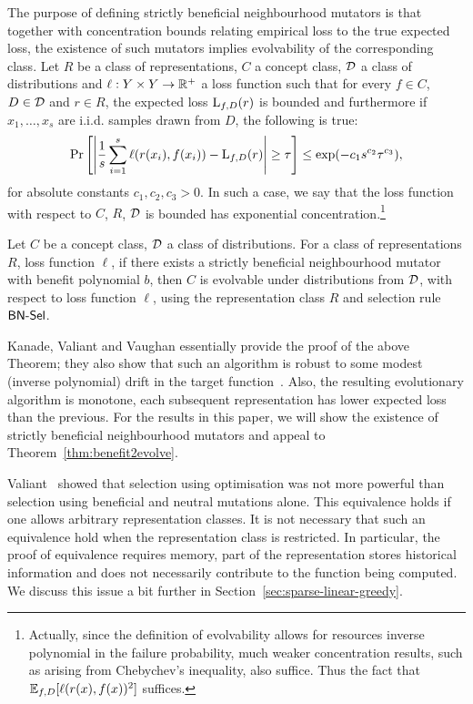 The purpose of defining strictly beneficial neighbourhood mutators is that
together with concentration bounds relating empirical loss to the true expected
loss, the existence of such mutators implies evolvability of the corresponding
class. Let $R$ be a class of representations, $C$ a concept class, ${\mathcal D}$ a
class of distributions and $\ell : Y \times Y \rightarrow \mathbb{R}^+$ a loss
function such that for every $f \in C$, $D \in {\mathcal D}$ and $r \in R$, the
expected loss $\mathrm{L}_{f, D}(r)$ is bounded and furthermore if $x_1, \ldots, x_s$
are i.i.d. samples drawn from $D$, the following is true:
%
\begin{align}
\Pr\left[ \left|\frac{1}{s} \sum_{i=1}^s \ell(r(x_i), f(x_i)) - \mathrm{L}_{f,
D}(r)\right| \geq \tau \right] \leq \exp( -c_1 s^{c_2} \tau^{c_3}),
\label{eqn:concentration-bound}
\end{align}
%
for absolute constants $c_1, c_2, c_3 > 0$. In such a case, we say that the loss
function with respect to $C$, $R$, ${\mathcal D}$ is bounded has exponential
concentration.\footnote{Actually, since the definition of evolvability allows
for resources inverse polynomial in the failure probability, much weaker
concentration results, such as arising from Chebychev's inequality, also
suffice. Thus the fact that $\mathbb{E}_{f, D}[\ell(r(x), f(x))^2]$ suffices.
}

\begin{theorem} \label{thm:benefit2evolve}
Let $C$ be a concept class, ${\mathcal D}$ a class of distributions. For a class of
representations $R$, loss function $\ell$, if there exists a strictly
beneficial neighbourhood mutator with benefit polynomial $b$, then $C$ is
evolvable under distributions from ${\mathcal D}$, with respect to loss function
$\ell$, using the representation class $R$ and selection rule $\mathsf{BN\mbox{-}Sel}$.
\end{theorem}

Kanade, Valiant and Vaughan essentially provide the proof of the above Theorem;
they also show that such an algorithm is robust to some modest (inverse
polynomial) drift in the target function~\cite{KVV:2010-drift}.
Also, the resulting evolutionary algorithm is
monotone, \ie each subsequent representation has lower expected loss than the
previous. For the results in this paper, we will show the existence of strictly
beneficial neighbourhood mutators and appeal to
Theorem~\ref{thm:benefit2evolve}. 

\begin{remark} Valiant~\cite{Valiant:2009-evolvability} showed that selection
using optimisation was not more powerful than selection using beneficial and
neutral mutations alone. This equivalence holds if one allows arbitrary
representation classes. It is not necessary that such an equivalence hold when
the representation class is restricted. In particular, the proof of equivalence
requires memory, \ie part of the representation stores historical
information and does not necessarily contribute to the function being computed.
We discuss this issue a bit further in Section~\ref{sec:sparse-linear-greedy}.
\end{remark}

